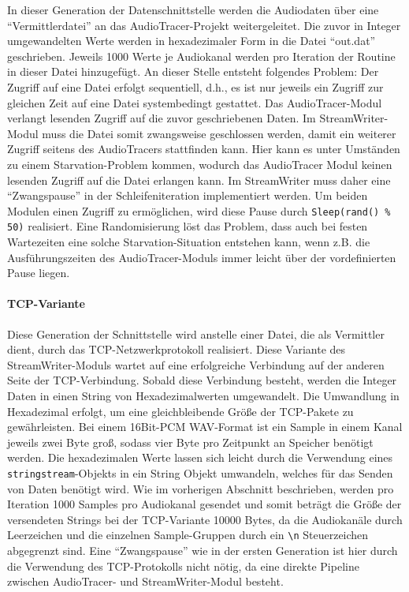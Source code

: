 In dieser Generation der Datenschnittstelle werden die Audiodaten über eine \enquote{Vermittlerdatei} an das AudioTracer-Projekt weitergeleitet. 
Die zuvor in Integer umgewandelten Werte werden in hexadezimaler Form in die Datei \enquote{out.dat} geschrieben.
Jeweils 1000 Werte je Audiokanal werden pro Iteration der Routine in dieser Datei hinzugefügt.
An dieser Stelle entsteht folgendes Problem: Der Zugriff auf eine Datei erfolgt sequentiell, d.h., es ist nur jeweils ein Zugriff zur gleichen Zeit auf eine Datei systembedingt gestattet.
Das AudioTracer-Modul verlangt lesenden Zugriff auf die zuvor geschriebenen Daten.
Im StreamWriter-Modul muss die Datei somit zwangsweise geschlossen werden, damit ein weiterer Zugriff seitens des AudioTracers stattfinden kann. 
Hier kann es unter Umständen zu einem Starvation-Problem kommen, wodurch das AudioTracer Modul keinen lesenden Zugriff auf die Datei erlangen kann.
Im StreamWriter muss daher eine \enquote{Zwangspause} in der Schleifeniteration implementiert werden. Um beiden Modulen einen Zugriff zu ermöglichen, wird diese Pause durch \texttt{Sleep(rand() \% 50)} realisiert.
Eine Randomisierung löst das Problem, dass auch bei festen Wartezeiten eine solche Starvation-Situation entstehen kann, wenn z.B. die Ausführungszeiten des AudioTracer-Moduls immer leicht über der vordefinierten Pause liegen.

\paragraph{TCP-Variante}

Diese Generation der Schnittstelle wird anstelle einer Datei, die als Vermittler dient, durch das TCP-Netzwerkprotokoll realisiert. 
Diese Variante des \\StreamWriter-Moduls wartet auf eine erfolgreiche Verbindung auf der anderen Seite der TCP-Verbindung. 
Sobald diese Verbindung besteht, werden die Integer Daten in einen String von Hexadezimalwerten umgewandelt. Die Umwandlung in Hexadezimal erfolgt, um eine gleichbleibende Größe der TCP-Pakete zu gewährleisten.
Bei einem 16Bit-PCM WAV-Format ist ein Sample in einem Kanal jeweils zwei Byte groß, sodass vier Byte pro Zeitpunkt an Speicher benötigt werden. 
Die hexadezimalen Werte lassen sich leicht durch die Verwendung eines \texttt{stringstream}-Objekts in ein String Objekt umwandeln, welches für das Senden von Daten benötigt wird. 
Wie im vorherigen Abschnitt beschrieben, werden pro Iteration 1000 Samples pro Audiokanal gesendet und somit beträgt die Größe der versendeten Strings bei der TCP-Variante 10000 Bytes, da die Audiokanäle durch Leerzeichen und die einzelnen Sample-Gruppen durch ein \texttt{\textbackslash n} Steuerzeichen abgegrenzt sind.
Eine \enquote{Zwangspause} wie in der ersten Generation ist hier durch die Verwendung des TCP-Protokolls nicht nötig, da eine direkte Pipeline zwischen AudioTracer- und StreamWriter-Modul besteht.


